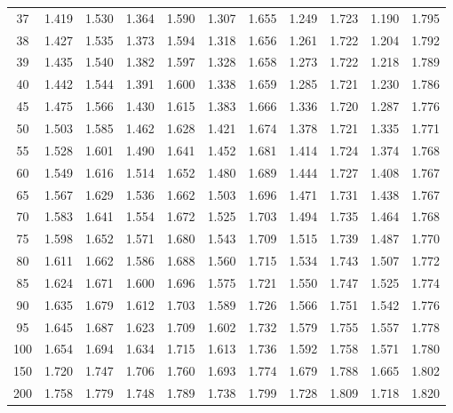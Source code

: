 \documentclass[12pt]{article}
\begin{document}
\begin{table}
\begin{center}
{\begin{tabular}{|c|c|c|c|c|c|c|c|c|c|c|}
37&
1.419&1.530&1.364&1.590&1.307&1.655&1.249&1.723&1.190&1.795\\


38&1.427&1.535&
1.373&1.594&1.318&1.656&1.261&1.722&1.204&1.792\\

39&1.435&1.540&1.382&1.597&
1.328&1.658&1.273&1.722&1.218&1.789\\


40&1.442&1.544&1.391&1.600&1.338&1.659& 1.285&1.721&1.230&
1.786\\

45&1.475&1.566&1.430&1.615&1.383&1.666&1.336&1.720&
1.287&1.776\\


50&1.503&1.585&1.462&1.628&1.421&1.674&1.378&1.721&1.335&1.771\\


55&1.528&
1.601&1.490&1.641&1.452&1.681&1.414&1.724&1.374&1.768\\

60&1.549&1.616&1.514&
1.652&1.480&1.689&1.444&1.727&1.408&1.767\\


65&1.567&1.629&1.536&1.662&1.503&
1.696&1.471&1.731&1.438&1.767\\

70&1.583&1.641&1.554&1.672&1.525&1.703&1.494&
1.735&1.464&1.768\\


75&1.598&1.652&1.571&1.680&1.543&1.709&1.515&1.739&1.487&
1.770\\


80&
1.611&1.662&1.586&1.688&1.560&1.715&1.534&1.743&1.507&1.772\\

85&1.624&1.671&
1.600&1.696&1.575&1.721&1.550&1.747&1.525&1.774\\



90&1.635&1.679&1.612&1.703&
1.589&1.726&1.566&1.751&1.542&1.776\\


95&1.645&1.687&1.623&1.709&1.602&1.732&
1.579&1.755&1.557&1.778\\

100&1.654&1.694&1.634&1.715&1.613&1.736&1.592&
1.758&1.571&1.780\\


150&1.720&1.747&1.706&1.760&1.693&1.774&1.679&1.788&
1.665&1.802\\


200&1.758&1.779&1.748&1.789&1.738&1.799&1.728&1.809&1.718&
1.820\\

  \hline
\end{tabular}
}
\end{center}
\end{table}
\end{document}
